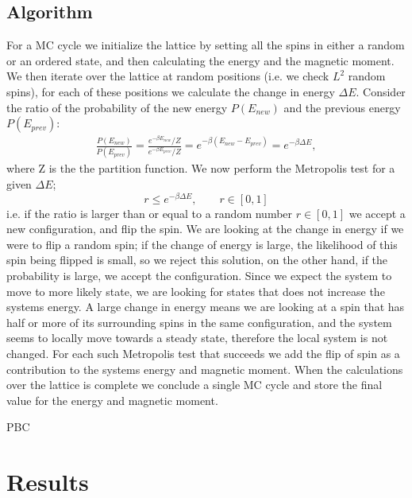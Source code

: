 \documentclass{emulateapj}
\begin{document}
\subsection{Algorithm}
For a MC cycle we initialize the lattice by setting all the spins in either a random or an ordered state, and then calculating the energy and the magnetic moment. We then iterate over the lattice at random positions (i.e. we check $L^2$ random spins), for each of these positions we calculate the change in energy $\Delta E$. Consider the ratio of the probability of the new energy $P\left(E_{new}\right)$ and the previous energy $P\left(E_{prev}\right)$:
%
\begin{align*}
    \frac{P\left(E_{new}\right)}{P\left(E_{prev}\right)} = \frac{e^{-\beta E_{new}}/Z}{e^{-\beta E_{prev}}/Z} = e^{-\beta\left(E_{new} - E_{prev}\right)} = e^{-\beta\Delta E},
\end{align*}
%
where Z is the the partition function. We now perform the Metropolis test for a given $\Delta E$;
%
\begin{equation*}
    r \leq e^{-\beta \Delta E}, \qquad r \in [0,1]
\end{equation*}
%
i.e. if the ratio is larger than or equal to a random number $r \in [0,1]$ we accept a new configuration, and flip the spin.  We are looking at the change in energy if we were to flip a random spin; if the change of energy is large, the likelihood of this spin being flipped is small, so we reject this solution, on the other hand, if the probability is large, we accept the configuration. Since we expect the system to move to more likely state, we are looking for states that does not increase the systems energy. A large change in energy means we are looking at a spin that has half or more of its surrounding spins in the same configuration, and the system seems to locally move towards a steady state, therefore the local system is not changed. For each such Metropolis test that succeeds we add the flip of spin as a contribution to the systems energy and magnetic moment. When the calculations over the lattice is complete we conclude a single MC cycle and store the final value for the energy and magnetic moment.

PBC

\section{Results}
\label{sec:results}
\end{document}
